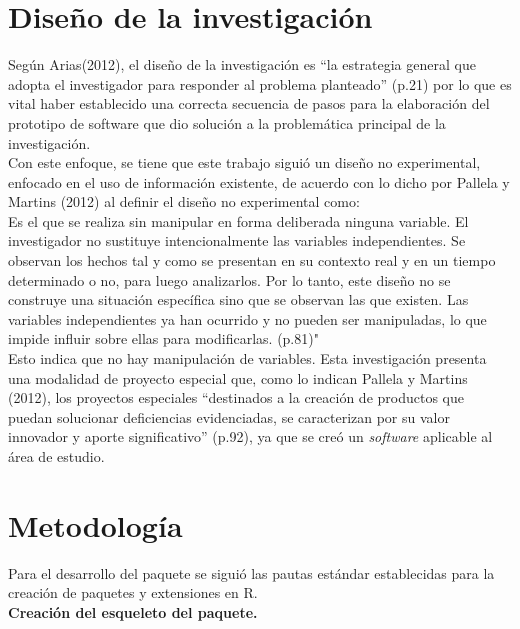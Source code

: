 \section{Dise\~no de la investigaci\'on}
	
Seg\'un Arias(2012), el dise\~no de la investigaci\'on es “la estrategia general que adopta el investigador para responder al problema planteado” (p.21) por lo que es vital haber establecido una correcta secuencia de pasos para la elaboraci\'on del prototipo de software que dio soluci\'on a la problem\'atica principal de la investigaci\'on.\\

Con este enfoque, se tiene que este trabajo sigui\'o un dise\~no no experimental, enfocado en el uso de informaci\'on existente, de acuerdo con lo dicho por Pallela y  Martins (2012) al definir el dise\~no no experimental como:\\

Es el que se realiza sin manipular en forma deliberada ninguna variable. El investigador no sustituye intencionalmente las variables independientes. Se observan los hechos tal y como se presentan en su contexto real y en un tiempo determinado o no, para luego analizarlos. Por lo tanto, este dise\~no no se construye una situaci\'on espec\'ifica sino que se observan las que existen. Las variables independientes ya han ocurrido y no pueden ser manipuladas, lo que impide influir sobre ellas para modificarlas. (p.81)"\\

Esto indica que no hay manipulaci\'on de variables. Esta investigaci\'on presenta una modalidad de proyecto especial que, como lo indican Pallela y  Martins (2012), los proyectos especiales “destinados a la creaci\'on de productos que puedan solucionar deficiencias evidenciadas, se caracterizan por su valor innovador y aporte significativo” (p.92), ya que se cre\'o un \emph{software} aplicable al \'area de estudio.\\

\section{Metodolog\'ia}

Para el desarrollo del paquete  se sigui\'o las pautas est\'andar establecidas para la creaci\'on de paquetes y extensiones en R.\\

\noindent
\textbf{Creaci\'on del esqueleto del paquete.}\\


